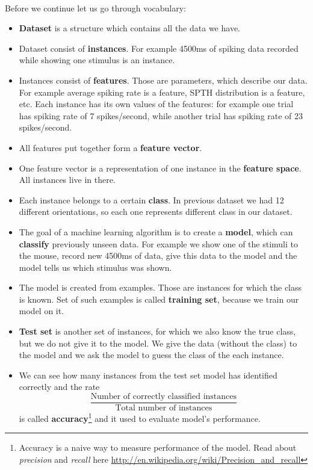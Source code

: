 \documentclass[a4paper,11pt]{article}
\begin{document}
%
%
\ \\
Before we continue let us go through vocabulary:
\begin{itemize}
\itemsep 0em
	\item \textbf{Dataset} is a structure which contains all the data we have.
	\item Dataset consist of \textbf{instances}. For example 4500ms of spiking data recorded while showing one stimulus is an instance.
	\item Instances consist of \textbf{features}. Those are parameters, which describe our data. For example average spiking rate is a feature, SPTH distribution is a feature, etc. Each instance has its own values of the features: for example one trial has spiking rate of 7 spikes/second, while another trial has spiking rate of 23 spikes/second.
	\item All features put together form a \textbf{feature vector}.
	\item One feature vector is a representation of one instance in the \textbf{feature space}. All instances live in there.
	\item Each instance belongs to a certain \textbf{class}. In previous dataset we had 12 different orientations, so each one represents different class in our dataset.
	\item The goal of a machine learning algorithm is to create a \textbf{model}, which can \textbf{classify} previously unseen data. For example we show one of the stimuli to the mouse, record new 4500ms of data, give this data to the model and the model tells us which stimulus was shown.
	\item The model is created from examples. Those are instances for which the class is known. Set of such examples is called \textbf{training set}, because we train our model on it.
	\item \textbf{Test set} is another set of instances, for which we also know the true class, but we do not give it to the model. We give the data (without the class) to the model and we ask the model to guess the class of the each instance.
	\item We can see how many instances from the test set model has identified correctly and the rate $$\displaystyle\frac{\text{Number of correctly classified instances}}{\text{Total number of instances}}$$ is called \textbf{accuracy}\footnote{Accuracy is a naive way to measure performance of the model. Read about \emph{precision} and \emph{recall} here \url{http://en.wikipedia.org/wiki/Precision_and_recall}} and it used to evaluate model's performance.

\end{itemize}
\end{document}
